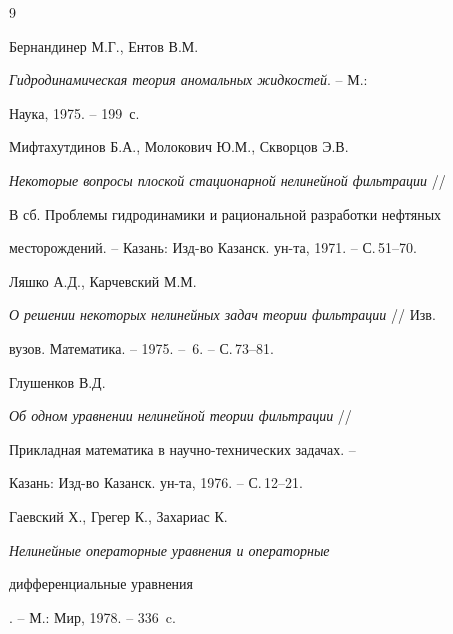 \begin{thebibliography}{9}







Бернандинер М.Г., Ентов В.М.


{\em Гидродинамическая теория аномальных жидкостей}. -- М.:


Наука, 1975. -- 199~с.







Мифтахутдинов Б.А., Молокович Ю.М., Скворцов Э.В.


{\em Некоторые вопросы плоской стационарной нелинейной фильтрации} //


В сб. Проблемы гидродинамики и рациональной разработки нефтяных


месторождений. -- Казань: Изд-во Казанск. ун-та, 1971. -- С.\,51--70.







Ляшко А.Д., Карчевский М.М.


{\em О решении некоторых нелинейных задач теории фильтрации} // Изв.


вузов. Математика. -- 1975. -- \No\,6. -- С.\,73--81.







Глушенков В.Д.


{\em Об одном уравнении нелинейной теории фильтрации} //


Прикладная математика в научно-технических задачах. --


Казань: Изд-во Казанск. ун-та, 1976. -- С.\,12--21.







Гаевский Х., Грегер К., Захариас К.


{\em Нелинейные операторные уравнения и операторные


дифференциальные уравнения}. -- М.: Мир, 1978. -- 336~c.








\end{thebibliography}





\vskip 2cm












\label{end}





